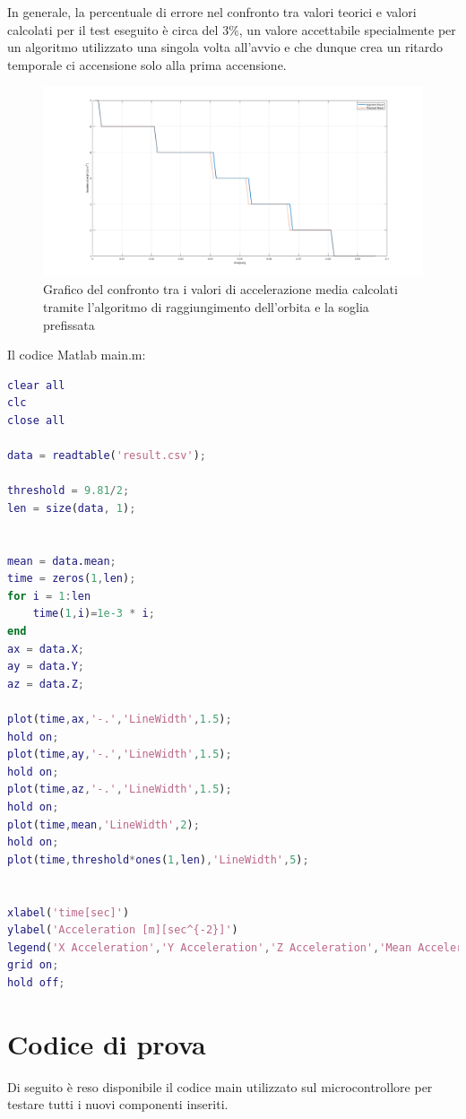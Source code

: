 \documentclass[LaM,binding=0.6cm]{../sapthesis}
\begin{document}
\begin{itemize}
    In generale, la percentuale di errore nel confronto tra valori teorici e valori calcolati per il test eseguito è circa del 3\%, un valore accettabile specialmente per un algoritmo utilizzato una singola volta all'avvio e che dunque crea un ritardo temporale ci accensione solo alla prima accensione.
    
    \begin{figure}[htbp]
    \centerline{\includegraphics[scale=0.4]{examples/CompareAlgorithResult.png}}
    \caption{Grafico del confronto tra i valori di accelerazione media calcolati tramite l'algoritmo di raggiungimento dell'orbita e la soglia prefissata}
    \label{fig}
    \end{figure}
\end{itemize}


\newpage
Il codice Matlab main.m:
\newline
\begin{lstlisting}[language=Matlab]
clear all
clc
close all

data = readtable('result.csv');

threshold = 9.81/2;
len = size(data, 1);


mean = data.mean;
time = zeros(1,len);
for i = 1:len
    time(1,i)=1e-3 * i;
end
ax = data.X;
ay = data.Y;
az = data.Z;

plot(time,ax,'-.','LineWidth',1.5);
hold on;
plot(time,ay,'-.','LineWidth',1.5);
hold on;
plot(time,az,'-.','LineWidth',1.5);
hold on;
plot(time,mean,'LineWidth',2);
hold on;
plot(time,threshold*ones(1,len),'LineWidth',5);


xlabel('time[sec]')
ylabel('Acceleration [m][sec^{-2}]')
legend('X Acceleration','Y Acceleration','Z Acceleration','Mean Acceleration','Acceleration Threshold')
grid on;
hold off;
\end{lstlisting}
\newpage
\section{Codice di prova}
Di seguito è reso disponibile il codice main utilizzato sul microcontrollore per testare tutti i nuovi componenti inseriti. 
\end{document}
